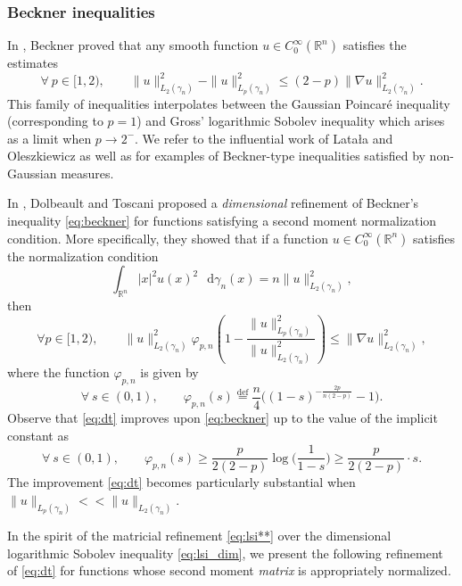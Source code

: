 \documentclass[a4paper,twoside,11pt,reqno]{amsart}
\newcommand{\eqdef}{\stackrel{\mathrm{def}}{=}}
\newcommand*\diff{\mathop{}\!\mathrm{d}}
\newcommand{\R}{\mathbb{R}} %
\begin{document}
\subsubsection{Beckner inequalities} 
In \cite{Bec89}, Beckner proved that any smooth function $u\in C_0^\infty(\R^n)$ satisfies the estimates
\begin{equation} \label{eq:beckner}
\forall \ p\in[1,2), \qquad \|u\|_{L_2(\gamma_n)}^2-\|u\|_{L_p(\gamma_n)}^2 \leq (2-p) \|\nabla u\|_{L_2(\gamma_n)}^2.
\end{equation}
This family of inequalities interpolates between the Gaussian Poincar\'e inequality (corresponding to $p=1$) and Gross' logarithmic Sobolev inequality \cite{Gro75} which arises as a limit when $p\to2^-$. We refer to the influential work of Lata\l a and Oleszkiewicz \cite{LO00} as well as \cite[Section~7.6]{BGL14} for examples of Beckner-type inequalities satisfied by non-Gaussian measures. 

In \cite[Corollary~4]{DT16}, Dolbeault and Toscani proposed a \emph{dimensional} refinement of Beckner's inequality \eqref{eq:beckner} for functions satisfying a second moment normalization condition. More specifically, they showed that if a function $u\in C_0^\infty(\R^n)$ satisfies the normalization condition
\begin{equation}
\int_{\R^n} |x|^2 u(x)^2\,\diff \gamma_n(x) = n \|u\|_{L_2(\gamma_n)}^2,
\end{equation}
then
\begin{equation} \label{eq:dt}
\forall p\in[1,2),\qquad \|u\|_{L_2(\gamma_n)}^2 \varphi_{p,n}\left(1-\frac{\|u\|_{L_p(\gamma_n)}^2}{\|u\|_{L_2(\gamma_n)}^2}\right) \leq \|\nabla u\|_{L_2(\gamma_n)}^2,
\end{equation}
where the function $\varphi_{p,n}$ is given by
\begin{equation}
\forall \ s\in(0,1),\qquad \varphi_{p,n}(s) \eqdef \frac{n}{4} \Big( (1-s)^{-\frac{2p}{n(2-p)}}-1\Big).
\end{equation}
Observe that \eqref{eq:dt} improves upon \eqref{eq:beckner} up to the value of the implicit constant as
\begin{equation}
\forall \ s\in(0,1),\qquad \varphi_{p,n}(s) \geq \frac{p}{2(2-p)} \log\Big(\frac{1}{1-s}\Big) \geq \frac{p}{2(2-p)}\cdot s.
\end{equation}
The improvement \eqref{eq:dt} becomes particularly substantial when $\|u\|_{L_p(\gamma_n)}<\!\!\!<\|u\|_{L_2(\gamma_n)}$.

In the spirit of the matricial refinement \eqref{eq:lsi**} over the dimensional logarithmic Sobolev inequality \eqref{eq:lsi_dim}, we present the following refinement of \eqref{eq:dt} for functions whose second moment \emph{matrix} is appropriately normalized.
\end{document}
